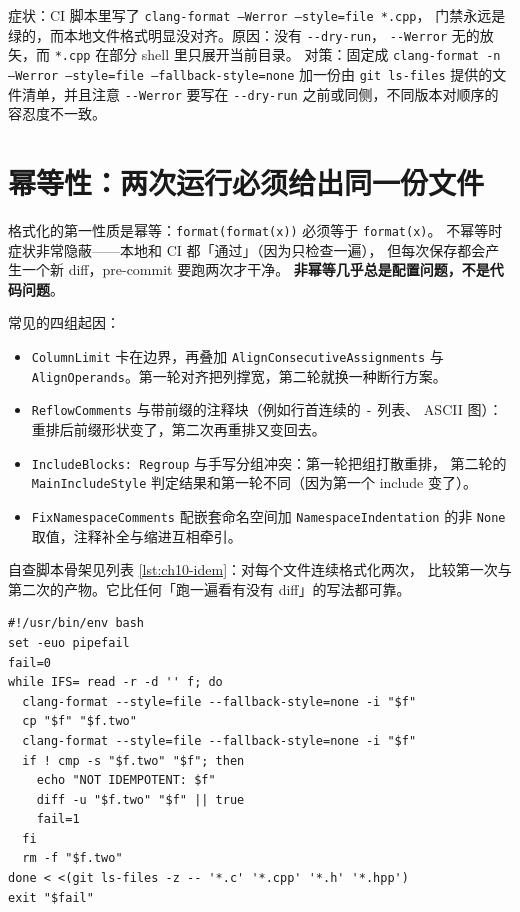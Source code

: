 \documentclass[12pt,a4paper,fontset=fandol]{ctexbook}
\newcommand{\Opt}[1]{\texttt{-\/-#1}}
\newcommand{\Bk}{\discretionary{}{}{}}
\begin{document}
\begin{warning}[title={\Opt{Werror} 只对 \Opt{dry-run} 生效}]
  症状：CI 脚本里写了 \texttt{clang-format --Werror --style=file *.cpp}，
  门禁永远是绿的，而本地文件格式明显没对齐。原因：没有 \Opt{dry-run}，
  \Opt{Werror} 无的放矢，而 \texttt{*.cpp} 在部分 shell 里只展开当前目录。
  对策：固定成 \texttt{clang-format -n --Werror --style=file --fallback-style=none}
  加一份由 \texttt{git ls-files} 提供的文件清单，并且注意
  \Opt{Werror} 要写在 \Opt{dry-run} 之前或同侧，不同版本对顺序的容忍度不一致。
\end{warning}

\section{幂等性：两次运行必须给出同一份文件}\label{sec:ch10-s2}

格式化的第一性质是幂等：\texttt{format(format(x))} 必须等于 \texttt{format(x)}。
不幂等时症状非常隐蔽——本地和 CI 都「通过」（因为只检查一遍），
但每次保存都会产生一个新 diff，pre-commit 要跑两次才干净。
\textbf{非幂等几乎总是配置问题，不是代码问题}。

常见的四组起因：

\begin{itemize}
  \item \texttt{ColumnLimit} 卡在边界，再叠加 \texttt{AlignConsecutive\hspace{0pt}Assignments}
    与 \texttt{AlignOperands}。第一轮对齐把列撑宽，第二轮就换一种断行方案。
  \item \texttt{ReflowComments} 与带前缀的注释块（例如行首连续的 \texttt{-} 列表、
    ASCII 图）：重排后前缀形状变了，第二次再重排又变回去。
  \item \texttt{Include{\Bk}Blocks: Regroup} 与手写分组冲突：第一轮把组打散重排，
    第二轮的 \texttt{Main{\Bk}Include{\Bk}Style} 判定结果和第一轮不同（因为第一个 include 变了）。
  \item \texttt{Fix{\Bk}Namespace{\Bk}Comments} 配嵌套命名空间加 \texttt{Namespace{\Bk}Indentation}
    的非 \texttt{None} 取值，注释补全与缩进互相牵引。
\end{itemize}

自查脚本骨架见列表 \ref{lst:ch10-idem}：对每个文件连续格式化两次，
比较第一次与第二次的产物。它比任何「跑一遍看有没有 diff」的写法都可靠。

\begin{lstlisting}[style=shellstyle,caption={幂等性自查：跑两次并比较},label={lst:ch10-idem}]
#!/usr/bin/env bash
set -euo pipefail
fail=0
while IFS= read -r -d '' f; do
  clang-format --style=file --fallback-style=none -i "$f"
  cp "$f" "$f.two"
  clang-format --style=file --fallback-style=none -i "$f"
  if ! cmp -s "$f.two" "$f"; then
    echo "NOT IDEMPOTENT: $f"
    diff -u "$f.two" "$f" || true
    fail=1
  fi
  rm -f "$f.two"
done < <(git ls-files -z -- '*.c' '*.cpp' '*.h' '*.hpp')
exit "$fail"
\end{lstlisting}
\end{document}

